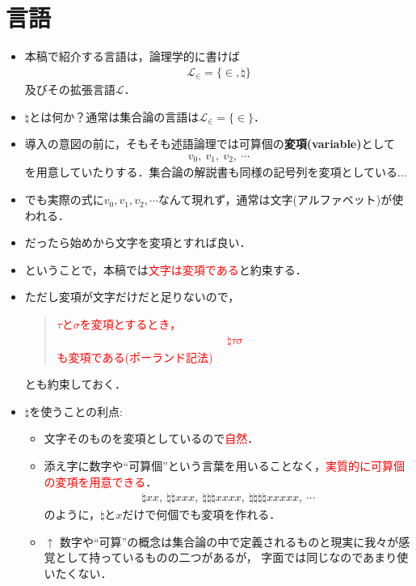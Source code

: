 \section{言語}
	\begin{itemize}
		\item 本稿で紹介する言語は，論理学的に書けば
			\begin{align}
				\mathcal{L}_{\in} = \{\in,\natural\}
			\end{align}
			及びその拡張言語$\mathcal{L}$．
			
		\item $\natural$とは何か？通常は集合論の言語は$\mathcal{L}_{\in} = \{\in\}$．
		
		\item 導入の意図の前に，そもそも述語論理では可算個の{\bf 変項}{\bf (variable)}として
			\begin{align}
				v_{0},\ v_{1},\ v_{2},\ \cdots
			\end{align}
			を用意していたりする．集合論の解説書も同様の記号列を変項としている...
			
\newpage
		\item でも実際の式に$v_{0},v_{1},v_{2},\cdots$なんて現れず，通常は文字(アルファベット)が使われる．
		
		\item だったら始めから文字を変項とすれば良い．
		
		\item ということで，本稿では\textcolor{red}{文字は変項である}と約束する．
			
		\item ただし変項が文字だけだと足りないので，
			\begin{center}
				\begin{quote}
					\textcolor{red}{$\tau$と$\sigma$を変項とするとき，
					\begin{align}
						\natural \tau \sigma
					\end{align}
					も変項である(ポーランド記法)}
				\end{quote}
			\end{center}
			とも約束しておく．
	
\newpage
		\item $\natural$を使うことの利点:
			\begin{itemize}
				\item 文字そのものを変項としているので\textcolor{red}{自然}．
				\item 添え字に数字や``可算個''という言葉を用いることなく，\textcolor{red}{実質的に可算個の変項を用意できる}．
					\begin{align}
						\natural xx,\ \natural \natural xxx,\ \natural \natural \natural xxxx,\ 
						\natural \natural \natural \natural xxxxx,\ \cdots
					\end{align}
					のように，$\natural$と$x$だけで何個でも変項を作れる．
				\item $\uparrow$ 数字や``可算''の概念は集合論の中で定義されるものと現実に我々が感覚として持っているものの二つがあるが，
					字面では同じなのであまり使いたくない．
			\end{itemize}
	\end{itemize}